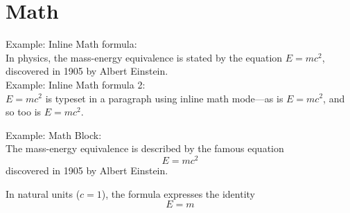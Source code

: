 \chapter{Math}


Example: Inline Math formula:  \\

In physics, the mass-energy equivalence is stated 
by the equation $E=mc^2$, discovered in 1905 by Albert Einstein. \\


Example: Inline Math formula 2: \\

\begin{math}
	E=mc^2
\end{math} is typeset in a paragraph using inline math mode---as is $E=mc^2$, and so too is \(E=mc^2\).

Example: Math Block: \\

The mass-energy equivalence is described by the famous equation
\[ E=mc^2 \] discovered in 1905 by Albert Einstein. 

In natural units ($c = 1$), the formula expresses the identity
\begin{equation}
	E=m
\end{equation}
